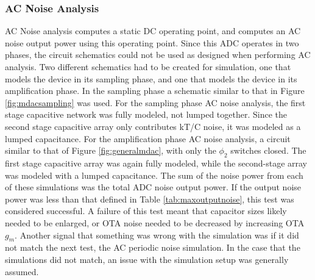 \subsubsection{AC Noise Analysis}
\label{sec:acnoisesim}
AC Noise analysis computes a static DC operating point, and computes an AC noise output power using this operating point. Since this ADC operates in two phases, the circuit schematics could not be used as designed when performing AC analysis. Two different schematics had to be created for simulation, one that models the device in its sampling phase, and one that models the device in its amplification phase. In the sampling phase a schematic similar to that in Figure \ref{fig:mdacsampling} was used. For the sampling phase AC noise analysis, the first stage capacitive network was fully modeled, not lumped together. Since the second stage capacitive array only contributes kT/C noise, it was modeled as a lumped capacitance. For the amplification phase AC noise analysis, a circuit similar to that of Figure \ref{fig:generalmdac}, with only the $\phi_{2}$ switches closed. The first stage capacitive array was again fully modeled, while the second-stage array was modeled with a lumped capacitance. The sum of the noise power from each of these simulations was the total ADC noise output power. If the output noise power was less than that defined in Table \ref{tab:maxoutputnoise}, this test was considered successful. A failure of this test meant that capacitor sizes likely needed to be enlarged, or OTA noise needed to be decreased by increasing OTA $g_{m}$. Another signal that something was wrong with the simulation was if it did not match the next test, the AC periodic noise simulation. In the case that the simulations did not match, an issue with the simulation setup was generally assumed.
